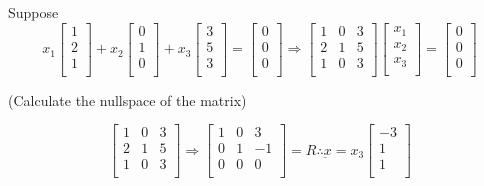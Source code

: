 \documentclass[12pt,a4paper]{article}
\begin{document}
Suppose 
\[
x_1
\begin{bmatrix}
  1 \\
  2 \\
  1 \\
\end{bmatrix} +
x_2
\begin{bmatrix}
  0 \\
  1 \\
  0 \\
\end{bmatrix} +
x_3
\begin{bmatrix}
  3 \\
  5 \\
  3 \\
\end{bmatrix} =
\begin{bmatrix}
  0 \\
  0 \\
  0 \\
\end{bmatrix}
\Rightarrow
\begin{bmatrix}
  1 & 0 & 3 \\
  2 & 1 & 5 \\
  1 & 0 & 3 \\
\end{bmatrix}
\begin{bmatrix}
  x_1 \\
  x_2 \\
  x_3 \\
\end{bmatrix} =
\begin{bmatrix}
  0 \\
  0 \\
  0 \\
\end{bmatrix}
\]

(Calculate the nullspace of the matrix)

\[
\begin{bmatrix}
  1 & 0 & 3 \\
  2 & 1 & 5 \\
  1 & 0 & 3 \\
\end{bmatrix}
\Rightarrow
\begin{bmatrix}
  1 & 0 & 3 \\
  0 & 1 & -1 \\
  0 & 0 & 0 \\
\end{bmatrix} = R
\therefore 
\underbar{x} = 
x_3
\begin{bmatrix}
  -3 \\
  1 \\
  1 \\
\end{bmatrix}
\]
\end{document}
